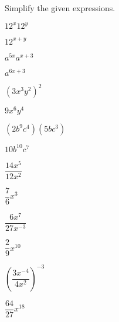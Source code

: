 %
%
\begin{exercises}
\begin{problem}
Simplify the given expressions.
\begin{multicols}{4}
	\begin{subproblem}
		$12^x12^y$
		\begin{shortsolution}
			$12^{x+y}$
		\end{shortsolution}
	\end{subproblem}
	\begin{subproblem}
		$a^{5x}a^{x+3}$
		\begin{shortsolution}
			$a^{6x+3}$
		\end{shortsolution}
	\end{subproblem}
	\begin{subproblem}
		$\left(3x^3y^2\right)^2$
		\begin{shortsolution}
			$9x^6y^4$
		\end{shortsolution}
	\end{subproblem}
	\begin{subproblem}
		$\left(2b^9c^4\right)\left(5bc^3\right)$
		\begin{shortsolution}
			$10b^{10}c^7$
		\end{shortsolution}
	\end{subproblem}
	\begin{subproblem}
		$\dfrac{14x^5}{12x^2}$
		\begin{shortsolution}
			$\dfrac{7}{6}x^3$
		\end{shortsolution}
	\end{subproblem}
	\begin{subproblem}
		$\dfrac{6x^7}{27x^{-3}}$
		\begin{shortsolution}
			$\dfrac{2}{9}x^{10}$
		\end{shortsolution}
	\end{subproblem}
	\begin{subproblem}
		$\left(\dfrac{3x^{-4}}{4x^2}\right)^{-3}$
		\begin{shortsolution}
			$\dfrac{64}{27}x^{18}$
		\end{shortsolution}
	\end{subproblem}
	\begin{subproblem}

\end{subproblem}
\end{multicols}
\end{problem}
\end{exercises}
